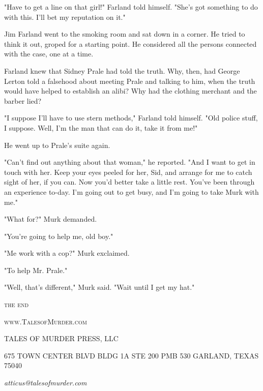 \documentclass{novel}
\begin{document}
"Have to get a line on that girl!" Farland told himself. "She's got something to do with this. I'll bet my reputation on it."

Jim Farland went to the smoking room and sat down in a corner. He tried to think it out, groped for a starting point. He considered all the persons connected with the case, one at a time.

Farland knew that Sidney Prale had told the truth. Why, then, had George Lerton told a falsehood about meeting Prale and talking to him, when the truth would have helped to establish an alibi? Why had the clothing merchant and the barber lied?

"I suppose I'll have to use stern methods," Farland told himself. "Old police stuff, I suppose. Well, I'm the man that can do it, take it from me!"

He went up to Prale's suite again.

"Can't find out anything about that woman," he reported. "And I want to get in touch with her. Keep your eyes peeled for her, Sid, and arrange for me to catch sight of her, if you can. Now you'd better take a little rest. You've been through an experience to-day. I'm going out to get busy, and I'm going to take Murk with me."

"What for?" Murk demanded.

"You're going to help me, old boy."

"Me work with a cop?" Murk exclaimed.

"To help Mr. Prale."

"Well, that's different," Murk said. "Wait until I get my hat."

\vspace{2\nbs}
\clearpage
\thispagestyle{empty}


\scenebreak
\scenebreak
{\centering\textsc{the end}\par}

\clearpage

\null

\centering\textsc{www.TalesofMurder.com}\par

\vspace*{10\nbs}


TALES OF MURDER PRESS, LLC

\null

\scshape{675 TOWN CENTER BLVD
BLDG 1A STE 200 PMB 530
GARLAND, TEXAS 75040}

\null

\textit{atticus@talesofmurder.com}
\vfill
\end{document}
